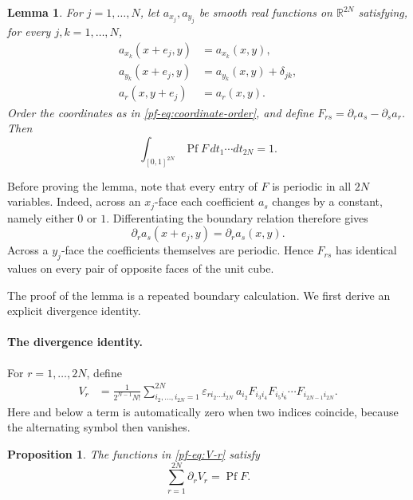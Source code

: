 \documentclass[11pt,reqno]{amsart}
\numberwithin{equation}{section}
\newtheorem{proposition}[theorem]{Proposition}
\newtheorem{lemma}[theorem]{Lemma}
\theoremstyle{definition}
\theoremstyle{remark}
\newcommand{\R}{\mathbb R}
\newcommand{\Pf}{\operatorname{Pf}}
\begin{document}
\begin{lemma}\label{pf-lem:boundary-pfaffian}
For $j=1,\ldots,N$, let $a_{x_j},a_{y_j}$ be smooth real functions on
$\R^{2N}$ satisfying, for every $j,k=1,\ldots,N$,
\begin{align}
 a_{x_k}(x+e_j,y)&=a_{x_k}(x,y),
 \label{pf-eq:abstract-bc-1}\\
 a_{y_k}(x+e_j,y)&=a_{y_k}(x,y)+\delta_{jk},
 \label{pf-eq:abstract-bc-2}\\
 a_r(x,y+e_j)&=a_r(x,y).
 \label{pf-eq:abstract-bc-3}
\end{align}
Order the coordinates as in \eqref{pf-eq:coordinate-order}, and define
$F_{rs}=\partial_ra_s-\partial_sa_r$.  Then
\begin{equation}\label{pf-eq:pf-integral-one}
 \int_{[0,1]^{2N}}\Pf F\,dt_1\cdots dt_{2N}=1.
\end{equation}
\end{lemma}

Before proving the lemma, note that every entry of $F$ is periodic in all
$2N$ variables.  Indeed, across an $x_j$-face each coefficient $a_s$
changes by a constant, namely either $0$ or $1$.  Differentiating the
boundary relation therefore gives
\[
 \partial_ra_s(x+e_j,y)=\partial_ra_s(x,y).
\]
Across a $y_j$-face the coefficients themselves are periodic.  Hence
$F_{rs}$ has identical values on every pair of opposite faces of the unit
cube.

The proof of the lemma is a repeated boundary calculation.  We first derive
an explicit divergence identity.

\paragraph{The divergence identity.}
For $r=1,\ldots,2N$, define
\begin{align}
 V_r
 &=\frac{1}{2^{N-1}N!}
 \sum_{i_2,\ldots,i_{2N}=1}^{2N}
 \varepsilon_{r i_2\ldots i_{2N}}\,
 a_{i_2}
 F_{i_3i_4}F_{i_5i_6}\cdots F_{i_{2N-1}i_{2N}}.
 \label{pf-eq:V-r}
\end{align}
Here and below a term is automatically zero when two indices coincide,
because the alternating symbol then vanishes.

\begin{proposition}\label{pf-prop:divergence}
The functions in \eqref{pf-eq:V-r} satisfy
\begin{equation}\label{pf-eq:divergence}
 \sum_{r=1}^{2N}\partial_rV_r=\Pf F.
\end{equation}
\end{proposition}
\end{document}
